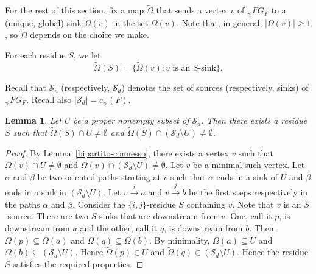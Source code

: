 \documentclass[12pt,reqno]{amsart}
\theoremstyle{plain}
\newtheorem{lem}[thm]{Lemma}
\newtheorem{cor}[thm]{Corollary}
\theoremstyle{definition}
\theoremstyle{remark}
\begin{document}

For the rest of this section, fix a map $\tilde{\Omega}$ that sends a vertex $v$ of $_{\preceq}FG_F$ to a (unique, global) sink  $\tilde{\Omega}(v)$ in the set $\Omega(v)$.
Note that, in general, $|\Omega(v)|\geq 1$, so $\tilde{\Omega}$ depends on the choice we make. 

For each residue $S$, we let
$$\tilde{\Omega}(S) =\{ \tilde{\Omega}(v) : \text{$v$ is an $S$-sink} \}.$$




Recall that $\mathcal S_{u}$ (respectively, $\mathcal S_{d}$) denotes the set of sources (respectively, sinks) of $_{\preceq} FG_F$. Recall also $|\mathcal S_{d}|=c_{\preceq}(F)$. 

\begin{lem}\label{perlemmino2}
Let $U$ be a proper nonempty subset of $\mathcal S_{d}$. Then there exists a residue $S$ such that $\tilde{\Omega}(S)\cap U \neq \emptyset$ and $ \tilde{\Omega}(S) \cap (\mathcal S_{d}\setminus U) \neq \emptyset$.
\end{lem}
\begin{proof}
By Lemma~\ref{bipartito-connesso}, there exists a vertex $v$ such that $\Omega(v)\cap U \neq \emptyset$ and $\Omega(v)\cap (\mathcal S_{d}\setminus U) \neq \emptyset$. 
Let $v$ be a minimal such vertex. 
Let $\alpha$ and $\beta$ be two oriented paths starting at $v$ such that $\alpha$ ends in a sink of $U$ and $\beta$ ends in a sink in $(\mathcal S_{d}\setminus U)$.  Let $v \stackrel{i}{\rightarrow} a$ and $v \stackrel{j}\rightarrow b$ be the first steps respectively in the paths $\alpha$ and $\beta$. Consider the $\{i,j\}$-residue $S$ containing $v$. Note that $v$ is an $S$-source. There are two $S$-sinks that are downstream from $v$. One, call it $p$,  is downstream from $a$ and the other, call it $q$, is downstream from $b$. Then $\Omega(p)\subseteq \Omega(a)$ and  $\Omega(q)\subseteq \Omega(b)$. 
By minimality, $\Omega(a) \subseteq U$ and $\Omega(b) \subseteq (\mathcal S_{d}\setminus U)$. Hence  $\tilde{\Omega}(p) \in U$ and $\tilde{\Omega}(q) \in (\mathcal S_{d}\setminus U)$. Hence the residue $S$ satisfies the required properties.
\end{proof}
\end{document}

